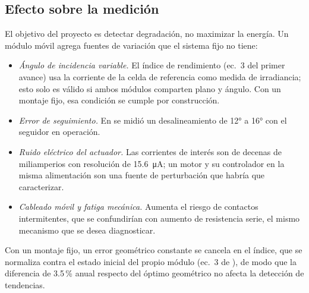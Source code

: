 \documentclass[10pt,letterpaper,twocolumn]{article}
\begin{document}
\subsection{Efecto sobre la medición}
El objetivo del proyecto es detectar degradación, no maximizar la energía. Un módulo móvil agrega fuentes de variación que el sistema fijo no tiene:
\begin{itemize}
\item \emph{Ángulo de incidencia variable.} El índice de rendimiento (ec.~3 del primer avance) usa la corriente de la celda de referencia como medida de irradiancia; esto solo es válido si ambos módulos comparten plano y ángulo. Con un montaje fijo, esa condición se cumple por construcción.
\item \emph{Error de seguimiento.} En \cite{switchdoc} se midió un desalineamiento de 12° a 16° con el seguidor en operación.
\item \emph{Ruido eléctrico del actuador.} Las corrientes de interés son de decenas de miliamperios con resolución de \SI{15.6}{\micro\ampere}; un motor y su controlador en la misma alimentación son una fuente de perturbación que habría que caracterizar.
\item \emph{Cableado móvil y fatiga mecánica.} Aumenta el riesgo de contactos intermitentes, que se confundirían con aumento de resistencia serie, el mismo mecanismo que se desea diagnosticar.
\end{itemize}
Con un montaje fijo, un error geométrico constante se cancela en el índice, que se normaliza contra el estado inicial del propio módulo (ec.~3 de \cite{avance1}), de modo que la diferencia de 3.5\,\% anual respecto del óptimo geométrico no afecta la detección de tendencias.
\end{document}
